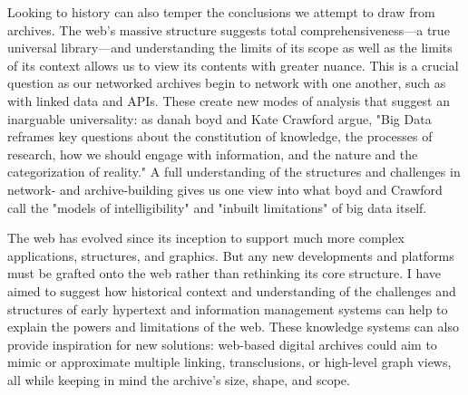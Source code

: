 Looking to history can also temper the conclusions we attempt to draw from archives. The web's massive structure suggests total comprehensiveness---a true universal library---and understanding the limits of its scope as well as the limits of its context allows us to view its contents with greater nuance. This is a crucial question as our networked archives begin to network with one another, such as with linked data and APIs. These create new modes of analysis that suggest an inarguable universality: as danah boyd and Kate Crawford argue, "Big Data reframes key questions about the constitution of knowledge, the processes of research, how we should engage with information, and the nature and the categorization of reality."  A full understanding of the structures and challenges in network- and archive-building gives us one view into what boyd and Crawford call the "models of intelligibility" and "inbuilt limitations" of big data itself.

The web has evolved since its inception to support much more complex applications, structures, and graphics. But any new developments and platforms must be grafted onto the web rather than rethinking its core structure. I have aimed to suggest how historical context and understanding of the challenges and structures of early hypertext and information management systems can help to explain the powers and limitations of the web. These knowledge systems can also provide inspiration for new solutions: web-based digital archives could aim to mimic or approximate multiple linking, transclusions, or high-level graph views, all while keeping in mind the archive's size, shape, and scope.
